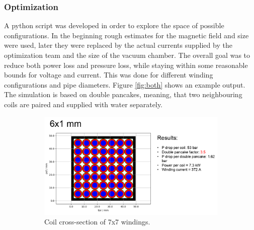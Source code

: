 \subsubsection{Optimization}
A python script was developed in order to explore the space of possible configurations.
In the beginning rough estimates for the magnetic field and size were used, later they were replaced by the actual currents supplied by the optimization team and the size of the vacuum chamber.
The overall goal was to reduce both power loss and pressure loss, while staying within some reasonable bounds for voltage and current.
This was done for different winding configurations and pipe diameters.
Figure \ref{fig:both} shows an example output. The simulation is based on double pancakes, meaning, that two neighbouring coils are paired and supplied with water separately.
\begin{figure}[h]
    \centering
    \begin{subfigure}[b]{0.7\textwidth}
        \centering
        \includegraphics[width=\textwidth]{Images/02_Coils/crosssection.png}
        \caption{Coil cross-section of 7x7 windings.}
        \label{fig:crosssection}
    \end{subfigure}\hfill
    \begin{subfigure}[b]{0.3\textwidth}
        \centering

\end{subfigure}
\end{figure}
